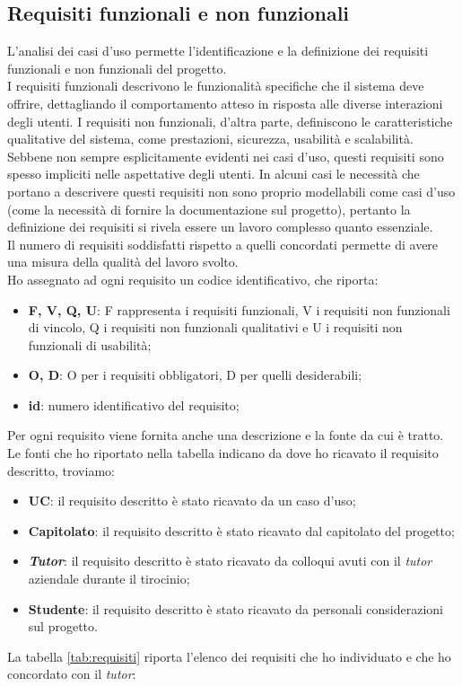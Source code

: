 \subsection{Requisiti funzionali e non funzionali}
L'analisi dei casi d'uso permette l'identificazione e la definizione dei requisiti funzionali e non funzionali del progetto.\\
I requisiti funzionali descrivono le funzionalità specifiche che il sistema deve offrire, dettagliando il comportamento atteso 
in risposta alle diverse interazioni degli utenti. 
I requisiti non funzionali, d'altra parte, definiscono le caratteristiche qualitative del sistema, come prestazioni, 
sicurezza, usabilità e scalabilità. Sebbene non sempre esplicitamente evidenti nei casi d'uso, questi requisiti 
sono spesso impliciti nelle aspettative degli utenti. In alcuni casi le necessità che portano a descrivere questi requisiti 
non sono proprio modellabili come casi d'uso (come la necessità di fornire la documentazione sul 
progetto), pertanto la definizione dei requisiti si rivela essere un lavoro complesso quanto essenziale.\\
Il numero di requisiti soddisfatti rispetto a quelli concordati permette di avere una misura della qualità del 
lavoro svolto.\\
Ho assegnato ad ogni requisito un codice identificativo, che riporta:
\begin{itemize}
    \item \textbf{F, V, Q, U}: F rappresenta i requisiti funzionali, V i requisiti non funzionali di vincolo, Q i 
          requisiti non funzionali qualitativi e U i 
          requisiti non funzionali di usabilità;
    \item \textbf{O, D}: O per i requisiti obbligatori, D per quelli desiderabili;
    \item \textbf{id}: numero identificativo del requisito;
\end{itemize}
Per ogni requisito viene fornita anche una descrizione e la fonte da cui è tratto.
Le fonti che ho riportato nella tabella indicano da dove ho ricavato il requisito descritto, troviamo:
\begin{itemize}
    \item \textbf{UC}: il requisito descritto è stato ricavato da un caso d'uso;
    \item \textbf{Capitolato}: il requisito descritto è stato ricavato dal capitolato del progetto;
    \item \textbf{\textit{Tutor}}: il requisito descritto è stato ricavato da colloqui avuti con il \textit{tutor} aziendale 
          durante il tirocinio;
    \item \textbf{Studente}: il requisito descritto è stato ricavato da personali considerazioni sul progetto.
\end{itemize}
La tabella \ref{tab:requisiti} riporta l'elenco dei requisiti che ho individuato e che ho concordato con il \textit{tutor}:

